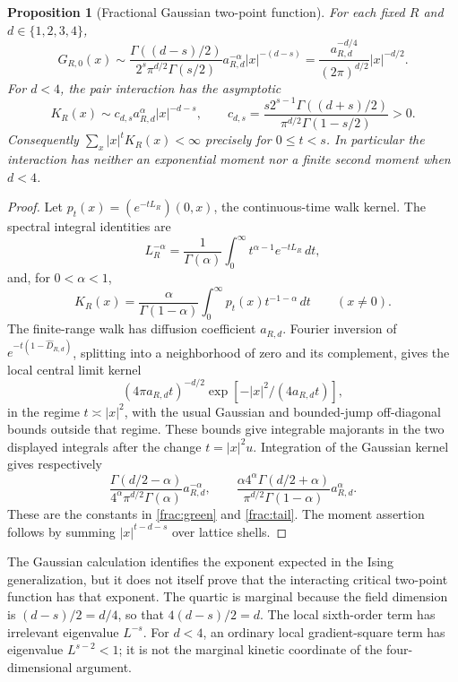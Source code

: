 \documentclass[11pt]{article}
\newtheorem{proposition}{Proposition}[section]
\begin{document}
\begin{proposition}[Fractional Gaussian two-point function]
\label{frac:green-prop}
For each fixed \(R\) and \(d\in\{1,2,3,4\}\),
\begin{equation}\label{frac:green}
 G_{R,0}(x)\sim
 \frac{\Gamma((d-s)/2)}{2^s\pi^{d/2}\Gamma(s/2)}
 a_{R,d}^{-\alpha}|x|^{-(d-s)}
 =\frac{a_{R,d}^{-d/4}}{(2\pi)^{d/2}}|x|^{-d/2}.
\end{equation}
For \(d<4\), the pair interaction has the asymptotic
\begin{equation}\label{frac:tail}
 K_R(x)\sim c_{d,s}a_{R,d}^{\alpha}|x|^{-d-s},\qquad
 c_{d,s}=\frac{s2^{s-1}\Gamma((d+s)/2)}
                    {\pi^{d/2}\Gamma(1-s/2)}>0.
\end{equation}
Consequently \(\sum_x|x|^tK_R(x)<\infty\) precisely for
\(0\le t<s\). In particular the interaction has neither an
exponential moment nor a finite second moment when \(d<4\).
\end{proposition}

\begin{proof}
Let \(p_t(x)=(e^{-tL_R})(0,x)\), the continuous-time walk kernel.
The spectral integral identities are
\[
 L_R^{-\alpha}=\frac1{\Gamma(\alpha)}
       \int_0^\infty t^{\alpha-1}e^{-tL_R}\,dt,
\]
and, for \(0<\alpha<1\),
\[
 K_R(x)=\frac{\alpha}{\Gamma(1-\alpha)}
       \int_0^\infty p_t(x)t^{-1-\alpha}\,dt
       \qquad(x\ne0).
\]
The finite-range walk has diffusion coefficient \(a_{R,d}\).
Fourier inversion of \(e^{-t(1-\widehat D_{R,d})}\), splitting
into a neighborhood of zero and its complement, gives the local
central limit kernel
\[
 (4\pi a_{R,d}t)^{-d/2}\exp[-|x|^2/(4a_{R,d}t)],
\]
in the regime \(t\asymp|x|^2\),
with the usual Gaussian and bounded-jump off-diagonal bounds
outside that regime. These bounds give integrable majorants in
the two displayed integrals after the change \(t=|x|^2u\).
Integration of the Gaussian kernel gives respectively
\[
 \frac{\Gamma(d/2-\alpha)}
       {4^\alpha\pi^{d/2}\Gamma(\alpha)}a_{R,d}^{-\alpha},
 \qquad
 \frac{\alpha4^\alpha\Gamma(d/2+\alpha)}
       {\pi^{d/2}\Gamma(1-\alpha)}a_{R,d}^{\alpha}.
\]
These are the constants in \eqref{frac:green} and
\eqref{frac:tail}. The moment assertion follows by summing
\(|x|^{t-d-s}\) over lattice shells.
\end{proof}

The Gaussian calculation identifies the exponent expected in the
Ising generalization, but it does not itself prove that the
interacting critical two-point function has that exponent. The
quartic is marginal because the field dimension is
\((d-s)/2=d/4\), so that \(4(d-s)/2=d\).
The local sixth-order term has irrelevant eigenvalue \(L^{-s}\).
For \(d<4\), an ordinary local gradient-square term has eigenvalue
\(L^{s-2}<1\); it is not the marginal kinetic coordinate of the
four-dimensional argument.
\end{document}
